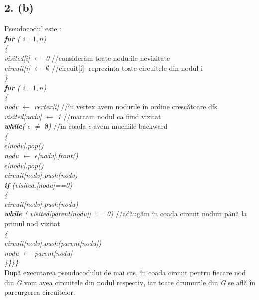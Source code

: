 \documentclass[12pt] {fphw}
\begin{document}
\subsection*{2. (b)} 
Pseudocodul este : \\
\textit{  \textbf{for} ( i= $\overline{1,n}$) } \\
\textit { \{ } \\
\textit{ visited[i] $\leftarrow$ 0 } //considerăm toate nodurile nevizitate \\ 
\textit{ circuit[i]  $\leftarrow$ $\emptyset$} //circuit[i]- reprezinta toate circuitele din nodul i \\
\textit { \} } \\
\textit{  \textbf{for} ( i= $\overline{1,n}$) } \\
\textit { \{ } \\
\textit{ nodv  $\leftarrow$ vertex[i] } //în vertex avem nodurile în ordine crescătoare dfs. \\
\textit{ visited[nodv] $\leftarrow$ 1 } //marcam nodul ca fiind vizitat\\
\textit{ \textbf{while}( $\epsilon$ $\neq$ $\emptyset$) } //în coada $\epsilon$ avem muchiile backward\\
\textit { \{ } \\
\textit{ $\epsilon$[nodv].pop() } \\
\textit{ nodu  $\leftarrow$ $\epsilon$[nodv].front()} \\
\textit{ $\epsilon$[nodv].pop() } \\
\textit { circuit[nodv].push(nodv) } \\
\textit {  \textbf{if} (visited.[nodu]==0) } \\
\textit { \{ } \\
\textit { circuit[nodv].push(nodu) } \\
\textit { \textbf{while} ( visited[parent[nodu]] == 0) } //adăugăm în coada circuit noduri până la primul nod vizitat \\
\textit { \{ } \\
\textit{ circuit[nodv].push(parent[nodu]) } \\
\textit{ nodu  $\leftarrow$ parent[nodu] } \\
\textit { \}\}\}\} } \\
 
După executarea pseudocodului de mai sus, în coada circuit pentru fiecare nod din \textit{G} vom avea circuitele din nodul respectiv, iar toate drumurile din \textit{G} se află în parcurgerea circuitelor. \\
\end{document}

